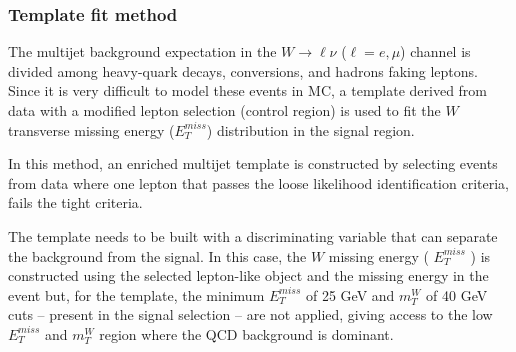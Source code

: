 
\subsubsection{Template fit method}
\label{sec:bkg_mj_we_ff}

The multijet background expectation in the $W\rightarrow \ell\nu$ ($\ell=e,\mu$) channel is divided among heavy-quark decays, conversions, and hadrons faking leptons. 
Since it is very difficult to model these events in MC, a template derived from data with a modified lepton selection (control region) is used to fit the $W$ transverse missing energy ($E_T^{miss}$) distribution in the signal region.

In this method, an enriched multijet template is constructed by selecting events from data where one lepton that passes the loose likelihood identification criteria, fails the tight criteria.





The template needs to be built with a discriminating variable that can separate the background from the
signal. 
In this case, the $W$ missing energy ( $E_{T}^{miss}$ ) is constructed using the selected lepton-like object and the missing energy in the event but, for the template, the minimum $E_{T}^{miss}$ of 25 GeV and $m_{T}^{W}$ of 40 GeV cuts – present in the signal selection – are not applied, giving access to the low $E_{T}^{miss}$ and $m_{T}^{W}$ region where the QCD background is dominant.

